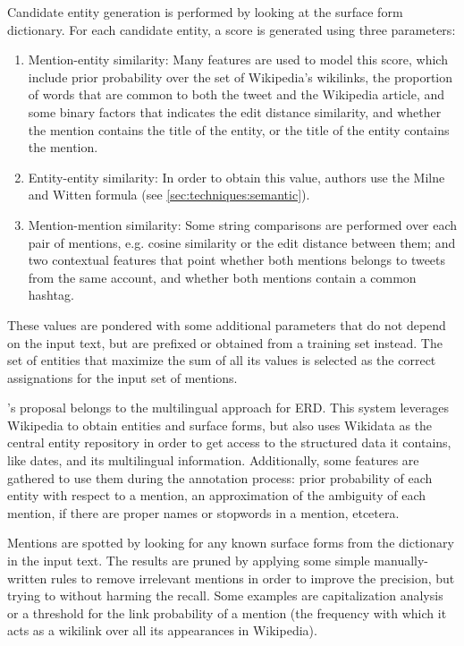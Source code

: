 Candidate entity generation is performed by looking at the surface form dictionary. For each candidate entity, a score is generated using three parameters:
%
\begin{enumerate}
\item Mention-entity similarity: Many features are used to model this score, which include prior probability over the set of Wikipedia's wikilinks, the proportion of words that are common to both the tweet and the Wikipedia article, and some binary factors that indicates the edit distance similarity, and whether the mention contains the title of the entity, or the title of the entity contains the mention.
\item Entity-entity similarity: In order to obtain this value, authors use the Milne and Witten formula (see \autoref{sec:techniques:semantic}).
\item Mention-mention similarity: Some string comparisons are performed over each pair of mentions, e.g. cosine similarity or the edit distance between them; and two contextual features that point whether both mentions belongs to tweets from the same account, and whether both mentions contain a common hashtag.
\end{enumerate}
%
These values are pondered with some additional parameters that do not depend on the input text, but are prefixed or obtained from a training set instead. The set of entities that maximize the sum of all its values is selected as the correct assignations for the input set of mentions.

\medskip

\cite{sodergren2017}'s proposal belongs to the multilingual approach for ERD. This system leverages Wikipedia to obtain entities and surface forms, but also uses Wikidata as the central entity repository in order to get access to the structured data it contains, like dates, and its multilingual information. Additionally, some features are gathered to use them during the annotation process: prior probability of each entity with respect to a mention, an approximation of the ambiguity of each mention, if there are proper names or stopwords in a mention, etcetera.

Mentions are spotted by looking for any known surface forms from the dictionary in the input text. The results are pruned by applying some simple manually-written rules to remove irrelevant mentions in order to improve the precision, but trying to without harming the recall. Some examples are capitalization analysis or a threshold for the link probability of a mention (the frequency with which it acts as a wikilink over all its appearances in Wikipedia).


